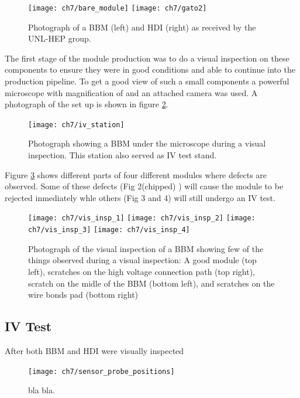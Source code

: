\begin{figure}[!h]
\centering
\texttt{[image: ch7/bare\_module]}
\texttt{[image: ch7/gato2]}
\caption[Photograph of a BBM and HDI.]{Photograph of a BBM (left) and HDI (right) as received by the UNL-HEP group.}\label{fig:bbmyhdi}
\end{figure}

The first stage of the module production was to do a visual inspection on these components to ensure they were in good conditions and able to continue into the production pipeline. To get a good view of such a small components a powerful microscope with magnification of {} and an attached camera was used. A photograph of the set up is shown in figure \ref{fig:iv_station}.

\begin{figure}[!h]
\centering
\texttt{[image: ch7/iv\_station]}
\caption[Photograph of the visual inspection and IV test station.]{Photograph showing a BBM under the microscope during a visual inspection. This station also served as IV test stand.}\label{fig:iv_station}
\end{figure}

Figure \ref{fig:vis_insp} shows different parts of four different modules where defects are observed. Some of these defects (Fig 2(chipped) ) will cause the module to be rejected inmediately whle others (Fig 3 and 4) will still undergo an IV test. 

\begin{figure}[!h]
  \centering
  \texttt{[image: ch7/vis\_insp\_1]}
  \texttt{[image: ch7/vis\_insp\_2]}
  \texttt{[image: ch7/vis\_insp\_3]}
  \texttt{[image: ch7/vis\_insp\_4]}
  \caption[Visual inspection of a bare module.]{Photograph of the visual inspection of a BBM showing few of the things observed during a visual inspection: A good module (top left), scratches on the high voltage connection path (top right), scratch on the midle of the BBM (bottom left), and scratches on the wire bonds pad (bottom right)}\label{fig:vis_insp}
\end{figure}

{}

\subsection{IV Test}
After both BBM and HDI were visually inspected 

\begin{figure}[!h]
  \centering
  \texttt{[image: ch7/sensor\_probe\_positions]}
  \caption[bla for index.]{bla bla.}\label{fig:sensor_probe_positions}
\end{figure}

